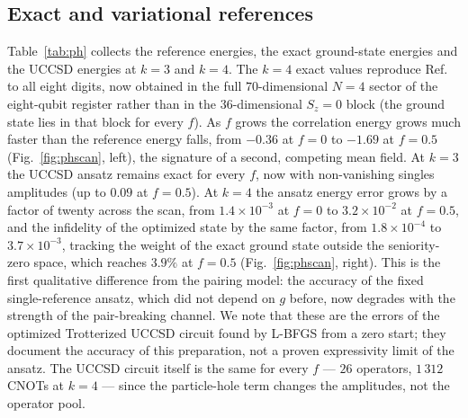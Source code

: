 \documentclass[
  aps,            %
  prc,            %
  reprint,        %
  superscriptaddress,
  floatfix,
  nofootinbib
]{revtex4-2}
\begin{document}
\subsection{Exact and variational references}
\label{sec:ph-bench}
Table~\ref{tab:ph} collects the reference energies, the exact ground-state
energies and the UCCSD energies at $k=3$ and $k=4$.  The $k=4$ exact values
reproduce Ref.~\cite{MHJbook} to all eight digits, now obtained in the full
$70$-dimensional $N=4$ sector of the eight-qubit register rather than in the
$36$-dimensional $S_z=0$ block (the ground state lies in that block for every
$f$).  As $f$ grows the correlation energy grows much faster than the
reference energy falls, from $-0.36$ at $f=0$ to $-1.69$ at $f=0.5$
(Fig.~\ref{fig:phscan}, left), the signature of a second, competing mean field.
At $k=3$ the UCCSD ansatz remains exact for every $f$, now with non-vanishing
singles amplitudes (up to $0.09$ at $f=0.5$).  At $k=4$ the ansatz energy
error grows by a factor of twenty across the scan, from $1.4\times10^{-3}$ at
$f=0$ to $3.2\times10^{-2}$ at $f=0.5$, and the infidelity of the optimized
state by the same factor, from $1.8\times10^{-4}$ to $3.7\times10^{-3}$,
tracking the weight of the exact ground state outside the seniority-zero
space, which reaches $3.9\%$ at $f=0.5$ (Fig.~\ref{fig:phscan}, right).  This
is the first qualitative difference from the pairing model: the accuracy of
the fixed single-reference ansatz, which did not depend on $g$ before, now
degrades with the strength of the pair-breaking channel.  We note that these
are the errors of the optimized Trotterized UCCSD circuit found by L-BFGS from
a zero start; they document the accuracy of this preparation, not a proven
expressivity limit of the ansatz.  The UCCSD circuit itself is the same for
every $f$ --- $26$ operators, $1\,312$ CNOTs at $k=4$ --- since the
particle-hole term changes the amplitudes, not the operator pool.
\end{document}
